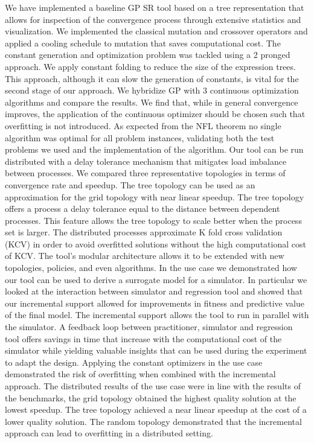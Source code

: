 
We have implemented a baseline GP SR tool based on a tree representation that allows for inspection of the convergence process through extensive statistics and visualization. We implemented the classical mutation and crossover operators and applied a cooling schedule to mutation that saves computational cost. 
The constant generation and optimization problem was tackled using a 2 pronged approach. We apply constant folding to reduce the size of the expression trees. This approach, although it can slow the generation of constants, is vital for the second stage of our approach. We hybridize GP with 3 continuous optimization algorithms and compare the results. We find that, while in general convergence improves, the application of the continuous optimizer should be chosen such that overfitting is not introduced.
As expected from the NFL theorem no single algorithm was optimal for all problem instances, validating both the test problems we used and the implementation of the algorithm.
Our tool can be run distributed with a delay tolerance mechanism that mitigates load imbalance between processes. We compared three representative topologies in terms of convergence rate and speedup. The tree topology can be used as an approximation for the grid topology with near linear speedup. The tree topology offers a process a delay tolerance equal to the distance between dependent processes. This feature allows the tree topology to scale better when the process set is larger. 
The distributed processes approximate K fold cross validation (KCV) in order to avoid overfitted solutions without the high computational cost of KCV. 
The tool's modular architecture allows it to be extended with new topologies, policies, and even algorithms. 
In the use case we demonstrated how our tool can be used to derive a surrogate model for a simulator. In particular we looked at the interaction between simulator and regression tool and showed that our incremental support allowed for improvements in fitness and predictive value of the final model. The incremental support allows the tool to run in parallel with the simulator. A feedback loop between practitioner, simulator and regression tool offers savings in time that increase with the computational cost of the simulator while yielding valuable insights that can be used during the experiment to adapt the design.
Applying the constant optimizers in the use case demonstrated the risk of overfitting when combined with the incremental approach. 
The distributed results of the use case were in line with the results of the benchmarks, the grid topology obtained the highest quality solution at the lowest speedup. The tree topology achieved a near linear speedup at the cost of a lower quality solution. The random topology demonstrated that the incremental approach can lead to overfitting in a distributed setting.